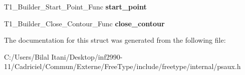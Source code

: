 \begin{DoxyCompactItemize}
\item 
T1\+\_\+\+Builder\+\_\+\+Start\+\_\+\+Point\+\_\+\+Func {\bfseries start\+\_\+point}\hypertarget{struct_t1___builder___funcs_rec___ab4897186c65875b4312d4ef68aad9d02}{}\label{struct_t1___builder___funcs_rec___ab4897186c65875b4312d4ef68aad9d02}

\item 
T1\+\_\+\+Builder\+\_\+\+Close\+\_\+\+Contour\+\_\+\+Func {\bfseries close\+\_\+contour}\hypertarget{struct_t1___builder___funcs_rec___abe163896432cc768719bf87cef0d1266}{}\label{struct_t1___builder___funcs_rec___abe163896432cc768719bf87cef0d1266}

\end{DoxyCompactItemize}


The documentation for this struct was generated from the following file\+:\begin{DoxyCompactItemize}
\item 
C\+:/\+Users/\+Bilal Itani/\+Desktop/inf2990-\/11/\+Cadriciel/\+Commun/\+Externe/\+Free\+Type/include/freetype/internal/psaux.\+h\end{DoxyCompactItemize}
